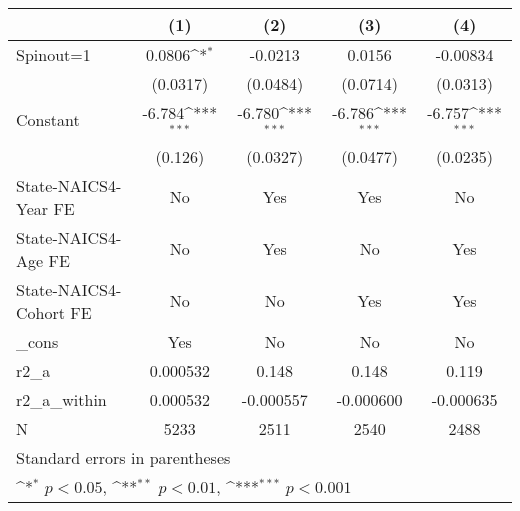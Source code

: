 {
\def\sym#1{\ifmmode^{#1}\else\(^{#1}\)\fi}
\begin{tabular}{l*{4}{c}}
\hline\hline
                    &\multicolumn{1}{c}{(1)}         &\multicolumn{1}{c}{(2)}         &\multicolumn{1}{c}{(3)}         &\multicolumn{1}{c}{(4)}         \\
\hline
Spinout=1           &      0.0806\sym{*}  &     -0.0213         &      0.0156         &    -0.00834         \\
                    &    (0.0317)         &    (0.0484)         &    (0.0714)         &    (0.0313)         \\
[1em]
Constant            &      -6.784\sym{***}&      -6.780\sym{***}&      -6.786\sym{***}&      -6.757\sym{***}\\
                    &     (0.126)         &    (0.0327)         &    (0.0477)         &    (0.0235)         \\
[1em]
State-NAICS4-Year FE&          No         &         Yes         &         Yes         &          No         \\
[1em]
State-NAICS4-Age FE &          No         &         Yes         &          No         &         Yes         \\
[1em]
State-NAICS4-Cohort FE&          No         &          No         &         Yes         &         Yes         \\
[1em]
\_cons              &         Yes         &          No         &          No         &          No         \\
\hline
r2\_a                &    0.000532         &       0.148         &       0.148         &       0.119         \\
r2\_a\_within         &    0.000532         &   -0.000557         &   -0.000600         &   -0.000635         \\
N                   &        5233         &        2511         &        2540         &        2488         \\
\hline\hline
\multicolumn{5}{l}{\footnotesize Standard errors in parentheses}\\
\multicolumn{5}{l}{\footnotesize \sym{*} \(p<0.05\), \sym{**} \(p<0.01\), \sym{***} \(p<0.001\)}\\
\end{tabular}
}

